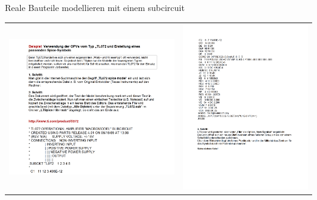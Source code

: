 \begin{frame}[t]{Reale Bauteile modellieren mit einem subcircuit}
\begin{spacing}{0.9}
\begin{tiny}
\begin{table}[h!]
\begin{tabular}{p{5cm} p{5cm}}
\begin{minipage}{0.5\textwidth}
                        \includegraphics[width=\linewidth]{pictures/legacy/tl072_1.png}
                    \end{minipage}
                     &
                    \begin{minipage}{0.5\textwidth}
                        \includegraphics[width=\linewidth]{pictures/legacy/tl072_2.png}

\end{minipage}
\end{tabular}
\end{table}
\end{tiny}
\end{spacing}
\end{frame}

